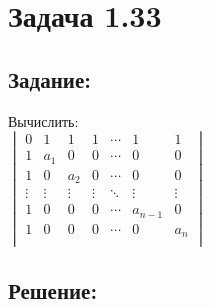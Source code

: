 \section{Задача 1.33}
\subsection{Задание:}
Вычислить:
\\[1em]
$
	\begin{vmatrix}
		0 & 1 & 1 & 1 & \cdots & 1 & 1 \\
		1 & a_1 & 0 & 0 & \cdots & 0 & 0 \\
		1 & 0 & a_2 & 0 & \cdots & 0 & 0 \\
		\vdots & \vdots & \vdots & \vdots & \ddots & \vdots & \vdots \\
		1 & 0 & 0 & 0 & \cdots & a_{n-1} & 0 \\
		1 & 0 & 0 & 0 & \cdots & 0 & a_n \\
	\end{vmatrix}
$
\subsection{Решение:}
